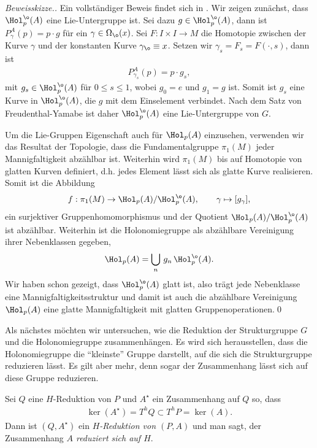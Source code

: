 \documentclass[%
	paper=a5,%
	fleqn,%
	DIV=18,%
	BCOR=0mm,
	fontsize=11pt,
	titlepage=false,%
	bibliography=totoc,
	DIV=18,%
	twoside=true,
	pdftitle=Riemannsche Geometrie,
	pdfauthor=Uwe Semmelmann,
	numbers=noendperiod]%
	{scrbook}
\begin{document}
\begin{proof}[Beweisskizze.] Ein vollständiger Beweis findet sich in \cite[Satz 4.3]{Baum:2009wk}.
Wir zeigen zunächst, dass $\Hol_{p}^{\o}(A)$ eine Lie-Untergruppe ist. Sei dazu $g\in \Hol_{p}^{\o}(A)$, dann ist $P_{\gamma}^A(p) = p\cdot g$ für ein $\gamma\in \Omega_{\o}(x)$. Sei $F\colon I\times I\to M$ die Homotopie zwischen der Kurve $\gamma$ und der konstanten Kurve $\gamma_{\o}\equiv x$. Setzen wir $\gamma_{s} = F_{s} = F(\cdot,s)$, dann ist
\begin{align*}
P_{\gamma_{s}}^A(p) =p\cdot g_{s},
\end{align*}
mit $g_{s}\in \Hol_{p}^\o(A)$ für $0\le s \le 1$, wobei $g_{0} = e$ und $g_{1} = g$ ist. Somit ist $g_{s}$ eine Kurve in $\Hol_{p}^\o(A)$, die $g$ mit dem Einselement verbindet. Nach dem Satz von Freudenthal-Yamabe ist daher $\Hol_{p}^\o(A)$ eine Lie-Untergruppe von $G$.

Um die Lie-Gruppen Eigenschaft auch für $\Hol_{p}(A)$ einzusehen, verwenden wir das Resultat der Topologie, dass die Fundamentalgruppe $\pi_{1}(M)$
jeder Mannigfaltigkeit abzählbar ist. Weiterhin wird $\pi_{1}(M)$ bis auf Homotopie von glatten Kurven definiert, d.h. jedes Element lässt sich als glatte Kurve realisieren. Somit ist die Abbildung
\begin{align*}
f: \pi_{1}(M)\to \Hol_{p}(A)/\Hol_{p}^\o(A),\qquad \gamma\mapsto [g_{\gamma}],
\end{align*}
ein surjektiver Gruppenhomomorphismus und der Quotient $\Hol_{p}(A)/\Hol_{p}^\o(A)$ ist abzählbar. Weiterhin ist die Holonomiegruppe als abzählbare Vereinigung ihrer Nebenklassen gegeben,
\begin{align*}
\Hol_{p}(A)  = \bigcup_{n} \,g_{n}\,\Hol_{p}^\o(A).
\end{align*}
Wir haben schon gezeigt, dass $\Hol_{p}^\o(A)$ glatt ist, also trägt jede Nebenklasse eine Mannigfaltigkeitsstruktur und damit ist auch die abzählbare Vereinigung $\Hol_{p}(A)$ eine glatte Mannigfaltigkeit mit glatten Gruppenoperationen.\qed
\end{proof}

Als nächstes möchten wir untersuchen, wie die Reduktion der Strukturgruppe $G$ und die Holonomiegruppe zusammenhängen. Es wird sich herausstellen, dass die Holonomiegruppe die ``kleinste'' Gruppe darstellt, auf die sich die Strukturgruppe reduzieren lässt. Es gilt aber mehr, denn sogar der Zusammenhang lässt sich auf diese Gruppe reduzieren.

\begin{defn}
Sei $Q$ eine $H$-Reduktion von $P$ und $A^\star$ ein Zusammenhang auf $Q$ so, dass
\begin{align*}
\ker(A^\star) = T^hQ \subset T^hP = \ker(A).
\end{align*}
Dann ist $(Q,A^\star)$ ein \emph{$H$-Reduktion von $(P,A)$} und man sagt, der Zusammenhang \emph{$A$ reduziert sich auf $H$}.\fish
\end{defn}
\end{document}
